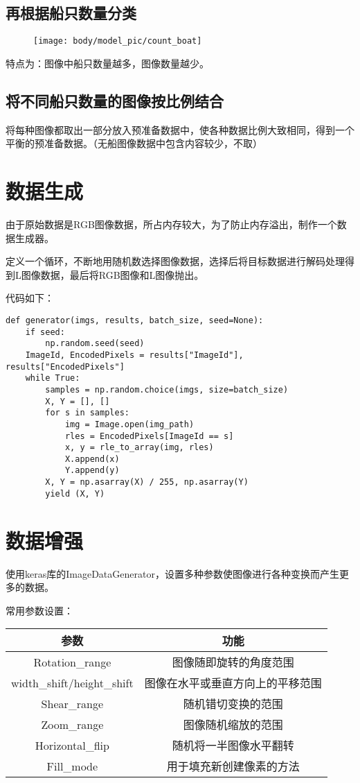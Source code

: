 \subsection{再根据船只数量分类}

\begin{figure}
\centering
\texttt{[image: body/model\_pic/count\_boat]}
\caption{}
\end{figure}

特点为：图像中船只数量越多，图像数量越少。

\subsection{将不同船只数量的图像按比例结合}

将每种图像都取出一部分放入预准备数据中，使各种数据比例大致相同，得到一个平衡的预准备数据。（无船图像数据中包含内容较少，不取）

\section{数据生成}

由于原始数据是RGB图像数据，所占内存较大，为了防止内存溢出，制作一个数据生成器。

定义一个循环，不断地用随机数选择图像数据，选择后将目标数据进行解码处理得到L图像数据，最后将RGB图像和L图像抛出。

代码如下：

\begin{verbatim}
def generator(imgs, results, batch_size, seed=None):
    if seed:
        np.random.seed(seed)
    ImageId, EncodedPixels = results["ImageId"], results["EncodedPixels"]
    while True:
        samples = np.random.choice(imgs, size=batch_size)
        X, Y = [], []
        for s in samples:
            img = Image.open(img_path)
            rles = EncodedPixels[ImageId == s]
            x, y = rle_to_array(img, rles)
            X.append(x)
            Y.append(y)
        X, Y = np.asarray(X) / 255, np.asarray(Y)
        yield (X, Y)
\end{verbatim}

\section{数据增强}

使用keras库的ImageDataGenerator，设置多种参数使图像进行各种变换而产生更多的数据。

常用参数设置：

\begin{longtable}[]{@{}cc@{}}
\toprule
参数 & 功能\tabularnewline
\midrule
\endhead
Rotation\_range & 图像随即旋转的角度范围\tabularnewline
width\_shift/height\_shift &
图像在水平或垂直方向上的平移范围\tabularnewline
Shear\_range & 随机错切变换的范围\tabularnewline
Zoom\_range & 图像随机缩放的范围\tabularnewline
Horizontal\_flip & 随机将一半图像水平翻转\tabularnewline
Fill\_mode & 用于填充新创建像素的方法\tabularnewline
\bottomrule
\end{longtable}

